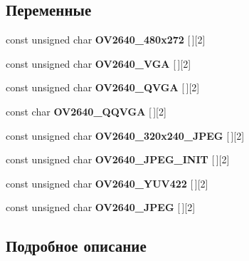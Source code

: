 \subsection*{Переменные}
\begin{DoxyCompactItemize}
\item 
\mbox{\label{group___o_v2640___private___variables_ga7eefb9955264fee148fa4f9cb7848d77}} 
const unsigned char {\bfseries O\+V2640\+\_\+480x272} \mbox{[}$\,$\mbox{]}\mbox{[}2\mbox{]}
\item 
\mbox{\label{group___o_v2640___private___variables_ga3a16e2a13bb91bf43bfced0e7d7c5d4e}} 
const unsigned char {\bfseries O\+V2640\+\_\+\+V\+GA} \mbox{[}$\,$\mbox{]}\mbox{[}2\mbox{]}
\item 
\mbox{\label{group___o_v2640___private___variables_ga35c39d5595dc8ece610eb9cad7c09bd2}} 
const unsigned char {\bfseries O\+V2640\+\_\+\+Q\+V\+GA} \mbox{[}$\,$\mbox{]}\mbox{[}2\mbox{]}
\item 
\mbox{\label{group___o_v2640___private___variables_ga01ae5475ed2e418f8cd0d46e32819925}} 
const char {\bfseries O\+V2640\+\_\+\+Q\+Q\+V\+GA} \mbox{[}$\,$\mbox{]}\mbox{[}2\mbox{]}
\item 
\mbox{\label{group___o_v2640___private___variables_ga5e10ecae279adfd43907580e39baa2e3}} 
const unsigned char {\bfseries O\+V2640\+\_\+320x240\+\_\+\+J\+P\+EG} \mbox{[}$\,$\mbox{]}\mbox{[}2\mbox{]}
\item 
\mbox{\label{group___o_v2640___private___variables_gac4eaec965673e623359c4e5a1af2d6d1}} 
const unsigned char {\bfseries O\+V2640\+\_\+\+J\+P\+E\+G\+\_\+\+I\+N\+IT} \mbox{[}$\,$\mbox{]}\mbox{[}2\mbox{]}
\item 
const unsigned char {\bfseries O\+V2640\+\_\+\+Y\+U\+V422} \mbox{[}$\,$\mbox{]}\mbox{[}2\mbox{]}
\item 
const unsigned char {\bfseries O\+V2640\+\_\+\+J\+P\+EG} \mbox{[}$\,$\mbox{]}\mbox{[}2\mbox{]}
\end{DoxyCompactItemize}


\subsection{Подробное описание}



